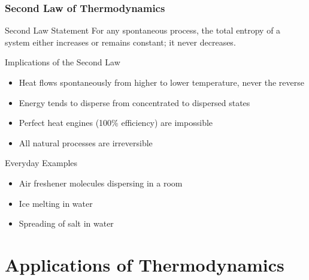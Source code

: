 \documentclass{beamer}
\begin{document}
\begin{frame}
    \frametitle{Second Law of Thermodynamics}
    \begin{alertblock}{Second Law Statement}
        For any spontaneous process, the total entropy of a system either increases or remains constant; it never decreases.
    \end{alertblock}
    
    \begin{block}{Implications of the Second Law}
        \begin{itemize}
            \item Heat flows spontaneously from higher to lower temperature, never the reverse
            \item Energy tends to disperse from concentrated to dispersed states
            \item Perfect heat engines (100\% efficiency) are impossible
            \item All natural processes are irreversible
        \end{itemize}
    \end{block}
    
    \begin{exampleblock}{Everyday Examples}
        \begin{itemize}
            \item Air freshener molecules dispersing in a room
            \item Ice melting in water
            \item Spreading of salt in water
        \end{itemize}
    \end{exampleblock}
\end{frame}

\section{Applications of Thermodynamics}
\end{document}
